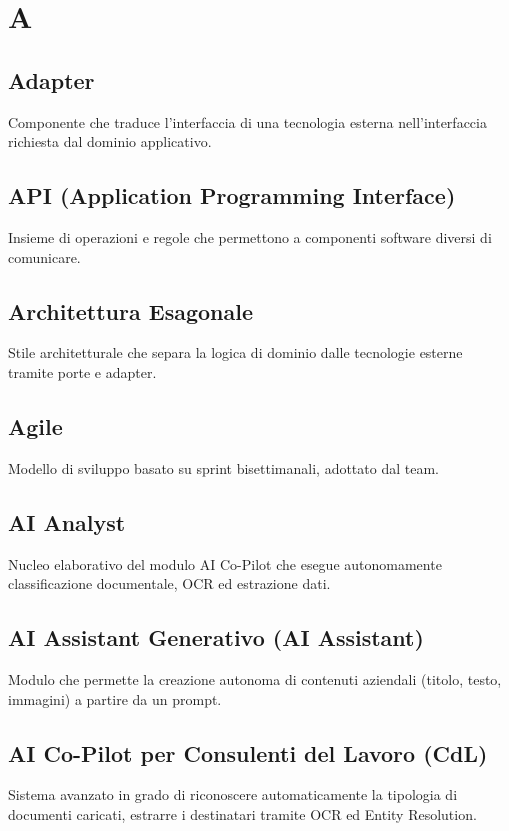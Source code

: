 \documentclass[a4paper,12pt]{article}
\begin{document}
\newpage
{}
\setcounter{page}{1}
\newpage

\tableofcontents

\newpage


\section{A}

\subsection{Adapter}
Componente che traduce l'interfaccia di una tecnologia esterna nell'interfaccia richiesta dal dominio applicativo.

\subsection{API (Application Programming Interface)}
Insieme di operazioni e regole che permettono a componenti software diversi di comunicare.

\subsection{Architettura Esagonale}
Stile architetturale che separa la logica di dominio dalle tecnologie esterne tramite porte e adapter.

\subsection{Agile}
Modello di sviluppo basato su sprint bisettimanali, adottato dal team.

\subsection{AI Analyst}
Nucleo elaborativo del modulo AI Co-Pilot che esegue autonomamente classificazione documentale, OCR ed estrazione dati.

\subsection{AI Assistant Generativo (AI Assistant)}
Modulo che permette la creazione autonoma di contenuti aziendali (titolo, testo, immagini) a partire da un prompt.

\subsection{AI Co-Pilot per Consulenti del Lavoro (CdL)}
Sistema avanzato in grado di riconoscere automaticamente la tipologia di documenti caricati, estrarre i destinatari tramite OCR ed Entity Resolution.
\end{document}
